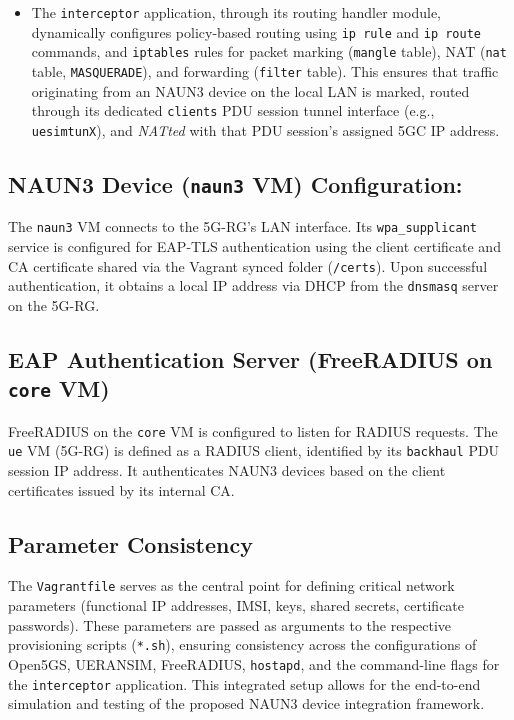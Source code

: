 \begin{itemize}
{\begin{itemize}
            \item The \texttt{interceptor} application, through its routing handler module, dynamically configures policy-based routing using \texttt{ip rule} and \texttt{ip route} commands, and \texttt{iptables} rules for packet marking (\texttt{mangle} table), \ac{NAT} (\texttt{nat} table, \texttt{MASQUERADE}), and forwarding (\texttt{filter} table). This ensures that traffic originating from an \ac{NAUN3} device on the local \ac{LAN} is marked, routed through its dedicated \texttt{clients} \ac{PDU} session tunnel interface (e.g., \texttt{uesimtunX}), and \textit{NATted} with that \ac{PDU} session's assigned \ac{5GC} \ac{IP} address.
        \end{itemize}
    }
\end{itemize}

\subsection{\ac{NAUN3} Device (\texttt{naun3} \ac{VM}) Configuration:}

The \texttt{naun3} \ac{VM} connects to the \ac{5G-RG}'s \ac{LAN} interface. Its \texttt{wpa\_supplicant} service is configured for \ac{EAP-TLS} authentication using the client certificate and \ac{CA} certificate shared via the Vagrant synced folder (\texttt{/certs}). Upon successful authentication, it obtains a local \ac{IP} address via \ac{DHCP} from the \texttt{dnsmasq} server on the \ac{5G-RG}.

\subsection{\ac{EAP} Authentication Server (FreeRADIUS on \texttt{core} \ac{VM})}

FreeRADIUS on the \texttt{core} \ac{VM} is configured to listen for \ac{RADIUS} requests. The \texttt{ue} \ac{VM} (\ac{5G-RG}) is defined as a \ac{RADIUS} client, identified by its \texttt{backhaul} \ac{PDU} session \ac{IP} address. It authenticates \ac{NAUN3} devices based on the client certificates issued by its internal \ac{CA}.

\subsection{Parameter Consistency}

The \texttt{Vagrantfile} serves as the central point for defining critical network parameters (functional \ac{IP} addresses, \ac{IMSI}, keys, shared secrets, certificate passwords). These parameters are passed as arguments to the respective provisioning scripts (\texttt{*.sh}), ensuring consistency across the configurations of Open5GS, UERANSIM, FreeRADIUS, \texttt{hostapd}, and the command-line flags for the \texttt{interceptor} application. This integrated setup allows for the end-to-end simulation and testing of the proposed \ac{NAUN3} device integration framework.

